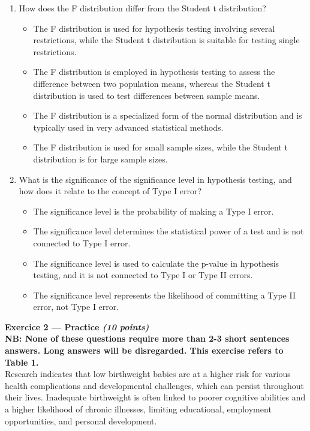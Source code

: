 \documentclass{article}
\begin{document}
\begin{enumerate}
\item How does the F distribution differ from the Student t distribution?
  \begin{itemize}
  \item[A.] The F distribution is used for hypothesis testing involving several restrictions, while the Student t distribution is suitable for testing single restrictions.
  \item[B.] The F distribution is employed in hypothesis testing to assess the difference between two population means, whereas the Student t distribution is used to test differences between sample means.
  \item[C.] The F distribution is a specialized form of the normal distribution and is typically used in very advanced statistical methods.
  \item[D.] The F distribution is used for small sample sizes, while the Student t distribution is for large sample sizes.
  \end{itemize}

\item What is the significance of the significance level in hypothesis testing, and how does it relate to the concept of Type I error?
  \begin{itemize}
  \item[A.] The significance level is the probability of making a Type I error.
  \item[B.] The significance level determines the statistical power of a test and is not connected to Type I error.
  \item[C.] The significance level is used to calculate the p-value in hypothesis testing, and it is not connected to Type I or Type II errors.
  \item[D.] The significance level represents the likelihood of committing a Type II error, not Type I error.
  \end{itemize}

\end{enumerate}



\newpage

\textbf{Exercice 2 --- Practice \textit{(10 points)}} \\[1em]
\textbf{NB: None of these questions require more than 2-3 short sentences answers. Long answers will be disregarded. This exercise refers to Table 1.}\\[1em]


Research indicates that low birthweight babies are at a higher risk for various health complications and developmental challenges, which can persist throughout their lives. Inadequate birthweight is often linked to poorer cognitive abilities and a higher likelihood of chronic illnesses, limiting educational, employment opportunities, and personal development.\\
\end{document}
